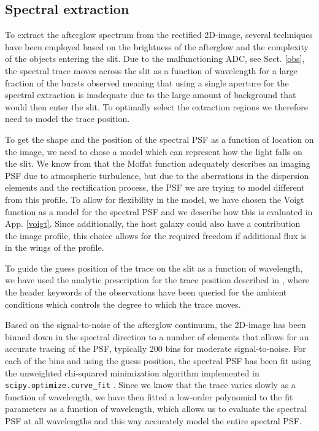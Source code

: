 \documentclass{aa}    %
\begin{document}
\subsection{Spectral extraction}    \label{extract}

To extract the afterglow spectrum from the rectified 2D-image, several
techniques have been employed based on the brightness of the afterglow and the
complexity of the objects entering the slit. Due to the malfunctioning ADC, see
Sect. \ref{obs}, the spectral trace moves across the slit as a function of
wavelength for a large fraction of the bursts observed meaning that using a
single aperture for the spectral extraction is inadequate due to the large
amount of background that would then enter the slit. To optimally select the
extraction regions we therefore need to model the trace position.

To get the shape and the position of the spectral PSF as a function of location
on the image, we need to chose a model which can represent how the light falls
on the slit. We know from \citet{Trujillo2001} that the Moffat function
\citep{Moffat1969} adequately describes an imaging PSF due to atmospheric
turbulence, but due to the aberrations in the dispersion elements and the
rectification process, the PSF we are trying to model different from this
profile. To allow for flexibility in the model, we have chosen the Voigt
function as a model for the spectral PSF and we describe how this is evaluated
in App. \ref{voigt}. Since additionally, the host galaxy could also have a
contribution the image profile, this choice allows for the required freedom if
additional flux is in the wings of the profile.

To guide the guess position of the trace on the slit as a function of
wavelength, we have used the analytic prescription for the trace position
described in \citet{Filippenko1982}, where the header keywords of the
observations have been queried for the ambient conditions which controls the
degree to which the trace moves.

Based on the signal-to-noise of the afterglow continuum, the 2D-image has been
binned down in the spectral direction to a number of elements that allows for an
accurate tracing of the PSF, typically 200 bins for moderate signal-to-noise.
For each of the bins and using the guess position, the spectral PSF has been fit
using the unweighted chi-squared minimization algorithm implemented in
\texttt{scipy.optimize.curve\_fit} \citep{scipy}. Since we know that the trace
varies slowly as a function of wavelength, we have then fitted a low-order
polynomial to the fit parameters as a function of wavelength, which allows us to
evaluate the spectral PSF at all wavelengths and this way accurately model the
entire spectral PSF.
\end{document}
